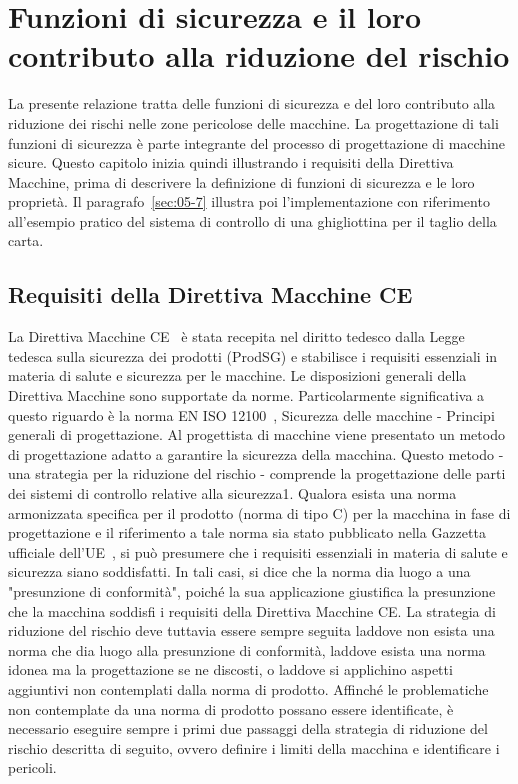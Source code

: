 \chapter{Funzioni di sicurezza e il loro contributo alla riduzione del rischio}
\label{cap:05}

La presente relazione tratta delle funzioni di sicurezza e del loro contributo alla riduzione dei rischi nelle zone pericolose delle macchine. La progettazione di tali funzioni di sicurezza è parte integrante del processo di progettazione di macchine sicure. Questo capitolo inizia quindi illustrando i requisiti della Direttiva Macchine, prima di descrivere la definizione di funzioni di sicurezza e le loro proprietà. Il paragrafo~\ref{sec:05-7} illustra poi l'implementazione con riferimento all'esempio pratico del sistema di controllo di una ghigliottina per il taglio della carta.

\section{Requisiti della Direttiva Macchine CE}
\label{sec:05-1}

La Direttiva Macchine CE~\cite{dir2006-42-ce} è stata recepita nel diritto tedesco dalla Legge tedesca sulla sicurezza dei prodotti (ProdSG) e stabilisce i requisiti essenziali in materia di salute e sicurezza per le macchine. Le disposizioni generali della Direttiva Macchine sono supportate da norme. Particolarmente significativa a questo riguardo è la norma EN ISO 12100~\cite{eniso12100}, Sicurezza delle macchine - Principi generali di progettazione. Al progettista di macchine viene presentato un metodo di progettazione adatto a garantire la sicurezza della macchina. Questo metodo - una strategia per la riduzione del rischio - comprende la progettazione delle parti dei sistemi di controllo relative alla sicurezza1.
Qualora esista una norma armonizzata specifica per il prodotto (norma di tipo C) per la macchina in fase di progettazione e il riferimento a tale norma sia stato pubblicato nella Gazzetta ufficiale dell'UE~\cite{elencoarmonizzate}, si può presumere che i requisiti essenziali in materia di salute e sicurezza siano soddisfatti. In tali casi, si dice che la norma dia luogo a una "presunzione di conformità", poiché la sua applicazione giustifica la presunzione che la macchina soddisfi i requisiti della Direttiva Macchine CE. La strategia di riduzione del rischio deve tuttavia essere sempre seguita laddove non esista una norma che dia luogo alla presunzione di conformità, laddove esista una norma idonea ma la progettazione se ne discosti, o laddove si applichino aspetti aggiuntivi non contemplati dalla norma di prodotto. Affinché le problematiche non contemplate da una norma di prodotto possano essere identificate, è necessario eseguire sempre i primi due passaggi della strategia di riduzione del rischio descritta di seguito, ovvero definire i limiti della macchina e identificare i pericoli.

